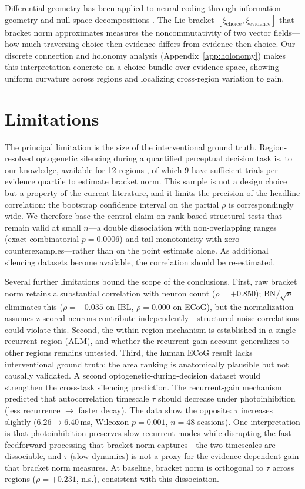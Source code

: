 \documentclass{article}
\begin{document}
Differential geometry has been applied to neural coding through information geometry \citep{amari2016information} and null-space decompositions \citep{kaufman2014cortical}. The Lie bracket $[\xi_{\text{choice}}, \xi_{\text{evidence}}]$ that bracket norm approximates measures the noncommutativity of two vector fields---how much traversing choice then evidence differs from evidence then choice. Our discrete connection and holonomy analysis (Appendix~\ref{app:holonomy}) makes this interpretation concrete on a choice bundle over evidence space, showing uniform curvature across regions and localizing cross-region variation to gain.

\section{Limitations}

The principal limitation is the size of the interventional ground truth. Region-resolved optogenetic silencing during a quantified perceptual decision task is, to our knowledge, available for 12 regions \citep{steinmetz2019distributed, zatkahaas2021}, of which 9 have sufficient trials per evidence quartile to estimate bracket norm. This sample is not a design choice but a property of the current literature, and it limits the precision of the headline correlation: the bootstrap confidence interval on the partial $\rho$ is correspondingly wide. We therefore base the central claim on rank-based structural tests that remain valid at small $n$---a double dissociation with non-overlapping ranges (exact combinatorial $p = 0.0006$) and tail monotonicity with zero counterexamples---rather than on the point estimate alone. As additional silencing datasets become available, the correlation should be re-estimated.

Several further limitations bound the scope of the conclusions. First, raw bracket norm retains a substantial correlation with neuron count ($\rho = +0.850$); $\text{BN}/\!\sqrt{n}$ eliminates this ($\rho = -0.035$ on IBL, $\rho = 0.000$ on ECoG), but the normalization assumes z-scored neurons contribute independently---structured noise correlations could violate this. Second, the within-region mechanism is established in a single recurrent region (ALM), and whether the recurrent-gain account generalizes to other regions remains untested. Third, the human ECoG result lacks interventional ground truth; the area ranking is anatomically plausible but not causally validated. A second optogenetic-during-decision dataset would strengthen the cross-task silencing prediction. The recurrent-gain mechanism predicted that autocorrelation timescale $\tau$ should decrease under photoinhibition (less recurrence $\to$ faster decay). The data show the opposite: $\tau$ increases slightly ($6.26 \to 6.40$\,ms, Wilcoxon $p = 0.001$, $n = 48$ sessions). One interpretation is that photoinhibition preserves slow recurrent modes while disrupting the fast feedforward processing that bracket norm captures---the two timescales are dissociable, and $\tau$ (slow dynamics) is not a proxy for the evidence-dependent gain that bracket norm measures. At baseline, bracket norm is orthogonal to $\tau$ across regions ($\rho = +0.231$, n.s.), consistent with this dissociation.
\end{document}
